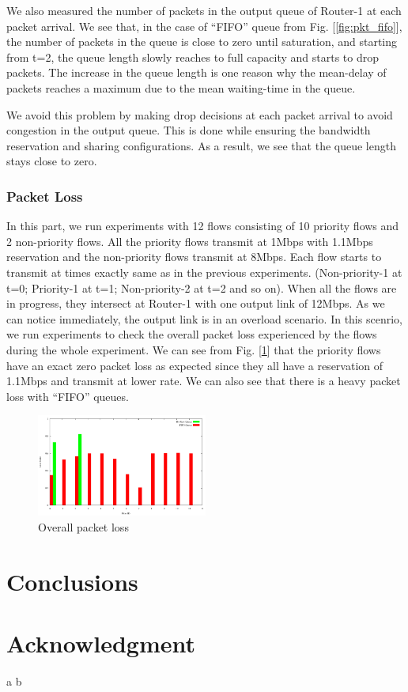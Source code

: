 \documentclass[conference]{IEEEtran}
\begin{document}
We also measured the number of packets in the output queue of Router-1 at each packet arrival. We see that, in the case of ``FIFO'' queue from Fig. [\ref{fig:pkt_fifo}], the number of packets in the queue is close to zero until saturation, and starting from t=2, the queue length slowly reaches to full capacity and starts to drop packets. The increase in the queue length is one reason why the mean-delay of packets reaches a maximum due to the mean waiting-time in the queue.

We avoid this problem by making drop decisions at each packet arrival to avoid congestion in the output queue. This is done while ensuring the bandwidth reservation and sharing configurations. As a result, we see that the queue length stays close to zero.

\subsubsection{Packet Loss}
In this part, we run experiments with 12 flows consisting of 10 priority flows and 2 non-priority flows. All the priority flows transmit at 1Mbps with 1.1Mbps reservation and the non-priority flows transmit at 8Mbps. Each flow starts to transmit at times exactly same as in the previous experiments. (Non-priority-1 at t=0; Priority-1 at t=1; Non-priority-2 at t=2 and so on). When all the flows are in progress, they intersect at Router-1 with one output link of 12Mbps. As we can notice immediately, the output link is in an overload scenario. In this scenrio, we run experiments to check the overall packet loss experienced by the flows during the whole experiment. We can see from Fig. [\ref{fig:loss}] that the priority flows have an exact zero packet loss as expected since they all have a reservation of 1.1Mbps and transmit at lower rate. We can also see that there is a heavy packet loss with ``FIFO'' queues. 

\begin{figure}[ht]
	\begin{center}
		\includegraphics[width=0.50\textwidth]{plots/loss.pdf}
		\caption{Overall packet loss}\label{fig:loss}
	\end{center}
\end{figure}

\section {Conclusions}

\section*{Acknowledgment}

\begin{thebibliography}{00}
 a
 b
\end{thebibliography}
\end{document}
